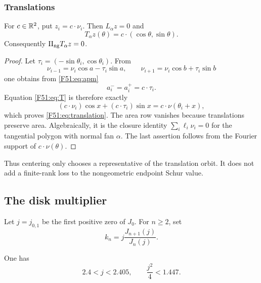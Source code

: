 \subsubsection{Translations}

\begin{lemma}\label{F51:lem:translations}
For $c\in\mathbb R^2$, put $z_i=c\cdot\nu_i$.  Then $L_\alpha z=0$ and
\begin{equation}\label{F51:eq:translation}
 T_\alpha z(\theta)=c\cdot(\cos\theta,\sin\theta).
\end{equation}
Consequently $\Pi_{\rm ng} T_\alpha z=0$.
\end{lemma}

\begin{proof}
Let $\tau_i=(-\sin\theta_i,\cos\theta_i)$.  From
\begin{equation}
 \nu_{i-1}=\nu_i\cos a-\tau_i\sin a,
 \qquad
 \nu_{i+1}=\nu_i\cos b+\tau_i\sin b
\end{equation}
one obtains from \eqref{F51:eq:apm}
\begin{equation}
 a_i^-=a_i^+=c\cdot\tau_i.
\end{equation}
Equation \eqref{F51:eq:T} is therefore exactly
\begin{equation}
 (c\cdot\nu_i)\cos x+(c\cdot\tau_i)\sin x
 =c\cdot\nu(\theta_i+x),
\end{equation}
which proves \eqref{F51:eq:translation}.  The area row vanishes because
translations preserve area.  Algebraically, it is the closure identity
$\sum_i\ell_i\nu_i=0$ for the tangential polygon with normal fan $\alpha$.
The last assertion follows from the Fourier support of
$c\cdot\nu(\theta)$.
\end{proof}

Thus centering only chooses a representative of the translation orbit.  It
does not add a finite-rank loss to the nongeometric endpoint Schur value.

\subsection{The disk multiplier}

Let $j=j_{0,1}$ be the first positive zero of $J_0$.  For $n\ge2$, set
\begin{equation}\label{F51:eq:kn}
 k_n=j\frac{J_{n+1}(j)}{J_n(j)}.
\end{equation}

\begin{lemma}\label{F51:lem:j-bound}
One has
\begin{equation}\label{F51:eq:j-bound}
 2.4<j<2.405,
 \qquad \frac{j^2}{4}<1.447.
\end{equation}
\end{lemma}

